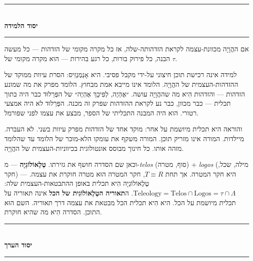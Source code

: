 \documentclass[10pt, openany, oneside]{book}
\renewcommand{\normalsize}{\fontsize{10}{13}\selectfont}
\begin{document}
\vspace{1.5em}


\begin{center}
    \rule{0.3\textwidth}{0.4pt}\\[0.5em]
    {\normalsize\bfseries\textsc{יסוד הלמידה}}\\[0.3em]
    \rule{0.3\textwidth}{0.4pt}
\end{center}

\vspace{1em}

\noindent אם ההֲוָיָה מכוונת-עצמה לקראת הזדהותה-שלה, אז כל מקרה מקומי של הזדהות — כל מעשה הבנה, כל פירוק בורות, כל רגע בהירות — הוא מקרה מקומי של $\tau$.

למידה אינה רכישת תוכן חיצוני על-ידי מקבל פסיבי. היא אָנַמְנֵזִיס: הסרת עיוות ממוקד של ההזדהות-העצמית של ההֲוָיָה. הלומד אינו מייבא אמת מבחוץ. הלומד מפרק את מה שמונע הזדהות — והזדהות הִיא מה שההֲוָיָה עושה. ״אֶהְיֶה, לְפִיכָךְ אֶהְיֶה״ של הפְּרֵלוּד כבר היה בתוך תכלית — כבר מכוון, כבר נע לקראת ההזדהות שפרק זה מכנה. הפְּרֵלוּד לא היה אמצעי רטורי. הוא היה המבנה התכליתי של הספר, מבצע את עצמו לפני שפורמל.

והוראה היא תכלית מיושמת על אחר: מוקד אחד של הזדהות מפרק עיוות בשני. לא העברה. מיילדות. המורה אינו מזריק תוכן. המורה משקף את עומקו הלא-מוכר של הלומד עד שהלומד מזהה אותו. כל חינוך מבוסס אונטולוגית בכיווניות-העצמית של ההֲוָיָה.

וכאן שם הסדרה חושף את גזירתו. \textbf{טֶלֶאוֹלוֹגְיָה} — מ-\textit{telos} (סוף, מטרה) + \textit{logos} (מילה, שכל, חקר) — היא חקר המטרה. אך תחת $T \equiv R$, חקר המטרה הוּא מטרה חוקרת את עצמה. טֶלֶאוֹלוֹגְיָה הִיא תכלית באופן ההתבטאות-העצמית שלה: $\text{Teleology} = \text{Telos} \cap \text{Logos} = \tau \cap \Lambda$. ה\textbf{תאוריה הטֶלֶאוֹלוֹגִית של הכל} אינה תאוריה על תכלית מיושמת על הכל. היא הִיא תכלית הכל מבטאת את עצמה דרך תאוריה. השם הוּא התוכן. הסדרה הִיא מה שהיא חוקרת.

\vspace{1.5em}


\begin{center}
    \rule{0.3\textwidth}{0.4pt}\\[0.5em]
    {\normalsize\bfseries\textsc{יסוד הערך}}\\[0.3em]
    \rule{0.3\textwidth}{0.4pt}
\end{center}
\end{document}
